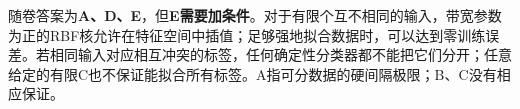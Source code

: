 随卷答案为\textbf{A、D、E}，但\textbf{E需要加条件}。对于有限个互不相同的输入，带宽参数为正的RBF核允许在特征空间中插值；足够强地拟合数据时，可以达到零训练误差。若相同输入对应相互冲突的标签，任何确定性分类器都不能把它们分开；任意给定的有限C也不保证能拟合所有标签。A指可分数据的硬间隔极限；B、C没有相应保证。
